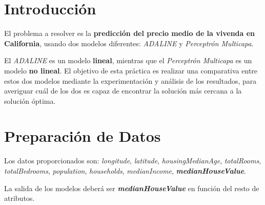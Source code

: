 \documentclass{uc3mpracticas}
\begin{document}
  \frontmatter



  \vspace{55mm}


  \newpage

  \tableofcontents

  \newpage

  \mainmatter

  \section{Introducción}

  El problema a resolver es la \textbf{predicción del precio medio de la vivenda en California}, usando dos modelos diferentes: \textit{ADALINE} y \textit{Perceptrón Multicapa}.

  \vspace{3mm}

  El \textit{ADALINE} es un modelo \textbf{lineal}, mientras que el \textit{Perceptrón Multicapa} es un modelo \textbf{no lineal}. El objetivo de esta práctica es realizar una comparativa entre estos dos modelos mediante la experimentación y análisis de los resultados, para averiguar cuál de los dos es capaz de encontrar la solución más cercana a la solución óptima.

  \section{Preparación de Datos}

  Los datos proporcionados son: \textit{longitude}, \textit{latitude}, \textit{housingMedianAge}, \textit{totalRooms}, \textit{totalBedrooms}, \textit{population}, \textit{households}, \textit{medianIncome}, \textit{\textbf{medianHouseValue}}.

  \vspace{3mm}

  La salida de los modelos deberá ser \textit{\textbf{medianHouseValue}} en función del resto de atributos.

  \vspace{2mm}
\end{document}

